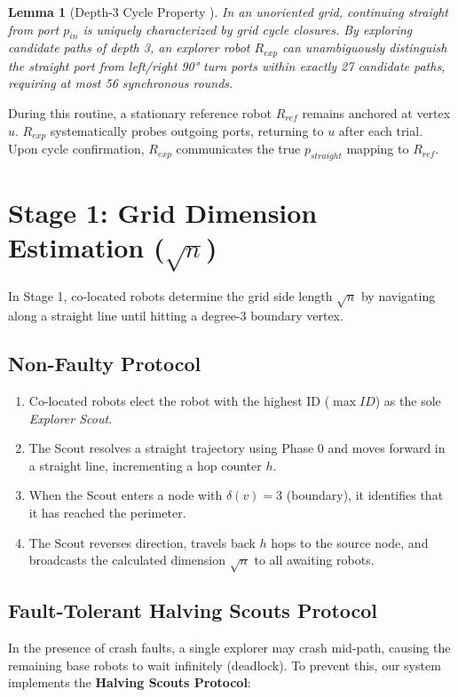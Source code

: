 \documentclass[11pt,a4paper]{report}
\newtheorem{lemma}[theorem]{Lemma}
\begin{document}
\begin{lemma}[Depth-3 Cycle Property \cite{banerjee2024optimizing}]
    In an unoriented grid, continuing straight from port $p_{in}$ is uniquely characterized by grid cycle closures. By exploring candidate paths of depth 3, an explorer robot $R_{exp}$ can unambiguously distinguish the straight port from left/right 90° turn ports within exactly 27 candidate paths, requiring at most 56 synchronous rounds.
\end{lemma}

During this routine, a stationary reference robot $R_{ref}$ remains anchored at vertex $u$. $R_{exp}$ systematically probes outgoing ports, returning to $u$ after each trial. Upon cycle confirmation, $R_{exp}$ communicates the true $p_{straight}$ mapping to $R_{ref}$.

\section{Stage 1: Grid Dimension Estimation ($\sqrt{n}$)}
In Stage 1, co-located robots determine the grid side length $\sqrt{n}$ by navigating along a straight line until hitting a degree-3 boundary vertex.

\subsection{Non-Faulty Protocol}
\begin{enumerate}
    \item Co-located robots elect the robot with the highest ID ($\max ID$) as the sole \emph{Explorer Scout}.
    \item The Scout resolves a straight trajectory using Phase 0 and moves forward in a straight line, incrementing a hop counter $h$.
    \item When the Scout enters a node with $\delta(v) = 3$ (boundary), it identifies that it has reached the perimeter.
    \item The Scout reverses direction, travels back $h$ hops to the source node, and broadcasts the calculated dimension $\sqrt{n}$ to all awaiting robots.
\end{enumerate}

\subsection{Fault-Tolerant Halving Scouts Protocol}
In the presence of crash faults, a single explorer may crash mid-path, causing the remaining base robots to wait infinitely (deadlock). To prevent this, our system implements the \textbf{Halving Scouts Protocol}:
\end{document}
